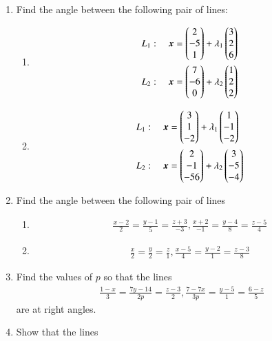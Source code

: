 \begin{enumerate}[label=\arabic*.,ref=\thesubsection.\theenumi]
\item Find the angle between the following pair of lines:
\begin{enumerate}
\item
\begin{align}
L_1: \quad \bm{x} &= \begin{pmatrix}2\\-5\\1\end{pmatrix} + \lambda_1\begin{pmatrix}3 \\ 2 \\6\end{pmatrix}
\\
L_2: \quad \bm{x} &= \begin{pmatrix}7\\-6\\0\end{pmatrix} + \lambda_2\begin{pmatrix}1 \\ 2 \\2\end{pmatrix}
\end{align}
\item
\begin{align}
L_1: \quad \bm{x} &= \begin{pmatrix}3\\1\\-2\end{pmatrix} + \lambda_1\begin{pmatrix}1 \\ -1 \\-2\end{pmatrix}
\\
L_2: \quad \bm{x} &= \begin{pmatrix}2\\-1\\-56\end{pmatrix} + \lambda_2\begin{pmatrix}3 \\ -5 \\-4\end{pmatrix}
\end{align}
\end{enumerate}
\item Find the angle between the following pair of lines
\begin{enumerate}
\item 
\begin{align}
\frac{x-2}{2} = \frac{y-1}{5} = \frac{z+3}{-3}, 
\frac{x+2}{-1} = \frac{y-4}{8} = \frac{z-5}{4} 
\end{align}
\item 
\begin{align}
\frac{x}{2} = \frac{y}{2} = \frac{z}{1}, 
\frac{x-5}{4} = \frac{y-2}{1} = \frac{z-3}{8} 
\end{align}
\end{enumerate}
\item Find the values of $p$ so that the lines 
\begin{align}
\frac{1-x}{3} = \frac{7y-14}{2p} = \frac{z-3}{2}, 
\frac{7-7x}{3p} = \frac{y-5}{1} = \frac{6-z}{5} 
\end{align}
are at right angles.
\item Show that the lines 

\end{enumerate}
